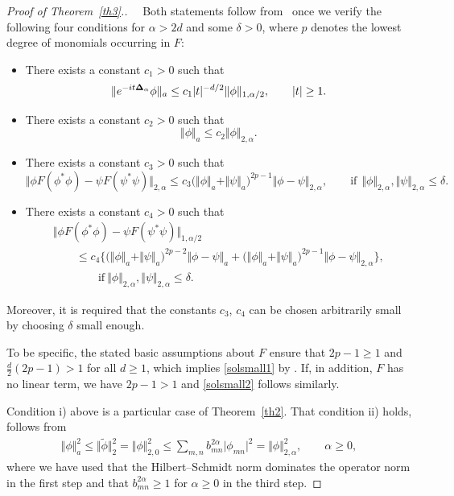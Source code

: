 \documentclass[11pt]{article}
\begin{document}
\begin{proof}[Proof of Theorem~\ref{th3}.]
~~Both statements follow from~ \cite[Theorem 16]{Reed} once we verify
the following four conditions for $\alpha> 2d$ and some $\delta>0$,
where $p$ denotes the lowest degree of monomials occurring in $F$:
\begin{itemize}\itemsep=0pt
\item[i)] There exists a constant $c_1>0$ such that
\[
\Vert e^{-it{\bf{\Delta}}_\alpha}\phi\Vert_a\leq
c_1 |t|^{-d/2} \Vert\phi\Vert_{1,\alpha/2},\qquad |t|\geq 1 .
\]
\item[ii)] There exists a constant $c_2>0$ such that
\[
\Vert\phi\Vert_a\leq c_2 \Vert\phi\Vert_{2,\alpha} .
\]
\item[iii)] There  exists a constant $c_3>0$ such that
\[
\Vert\phi F(\phi^*\phi)-\psi F(\psi^*\psi)\Vert_{2,\alpha}
\leq c_3\big(\Vert\phi\Vert_a+\Vert\psi\Vert_a\big)^{2p-1}
\Vert\phi-\psi\Vert_{2,\alpha} ,\qquad \mbox{if}\ \ \Vert\phi\Vert_{2,\alpha},
\Vert\psi\Vert_{2,\alpha}\leq\delta .
\]
\item[iv)]  There  exists a constant $c_4>0$ such that
\begin{gather*}
\Vert\phi F(\phi^*\phi)-\psi F(\psi^*\psi)\Vert_{1,\alpha/2}\\
\qquad {} \leq c_4\Big\{\big(\Vert\phi\Vert_a+\Vert\psi\Vert_a\big)^{2p-2}
\Vert\phi-\psi\Vert_a
  +
\big(\Vert\phi\Vert_a+\Vert\psi\Vert_a\big)^{2p-1}
\Vert\phi-\psi\Vert_{2,\alpha}\Big\} ,\\
\qquad \qquad \mbox{if} \ \Vert\phi\Vert_{2,\alpha},
\Vert\psi\Vert_{2,\alpha}\leq\delta .
\end{gather*}
\end{itemize}
Moreover, it is required that the constants $c_3$, $c_4$ can be chosen
arbitrarily small by choosing $\delta$ small enough.

To be specif\/ic, the stated basic assumptions about $F$ ensure that
 $2p-1\geq 1$ and $\frac d2(2p-1)> 1$ for all
$d\geq 1$, which implies \eqref{solsmall1} by  \cite[Theorem
16]{Reed}. If, in addition, $F$ has no linear term, we have $2p-1>1$
and \eqref{solsmall2} follows similarly.

Condition i) above is a particular case of Theorem~\ref{th2}. That
condition ii) holds, follows from
\begin{gather*}%
\Vert\phi\Vert_a^2 \leq \Vert\widetilde\phi\Vert^2_2 = \Vert\phi\Vert_{2,0}^2 \leq
\sum_{m,n}b_{mn}^{2\alpha}\big|\phi_{mn}\big|^2 = \Vert\phi\Vert^2_{2,\alpha},\qquad \alpha\geq0,
\end{gather*}
where we have used that the Hilbert--Schmidt norm dominates the operator
norm in the f\/irst step and that $b^{2\alpha}_{mn}\geq 1$ for
$\alpha\geq 0$ in the third step.


\end{proof}
\end{document}
